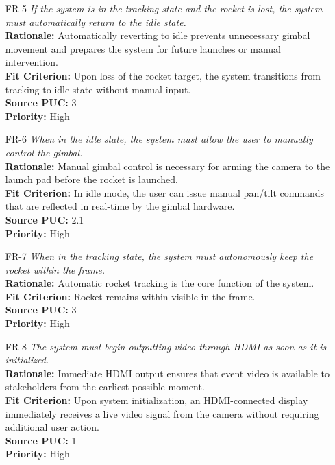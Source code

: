 \documentclass[12pt]{article}
\begin{document}
\begin{itemize}[leftmargin=*]
  \item[FR-5] \emph{If the system is in the tracking state and the rocket is lost, the
          system must automatically return to the idle state.}\\[2mm]
        \textbf{Rationale:} Automatically reverting to idle prevents unnecessary gimbal movement and prepares the system for future launches or manual intervention.\\
        \textbf{Fit Criterion:} Upon loss of the rocket target, the system transitions from tracking to idle state without manual input.\\
        \textbf{Source PUC:} 3 \\
        \textbf{Priority:} High

  \item[FR-6] \emph{When in the idle state, the system must allow the user to manually
          control the gimbal.}\\[2mm]
        \textbf{Rationale:} Manual gimbal control is necessary for arming the camera to the launch pad before the rocket is launched.\\
        \textbf{Fit Criterion:} In idle mode, the user can issue manual pan/tilt commands that are reflected in real-time by the gimbal hardware.\\
        \textbf{Source PUC:} 2.1 \\
        \textbf{Priority:} High

  \item[FR-7] \emph{When in the tracking state, the system must autonomously keep the
          rocket within the frame.}\\[2mm]
        \textbf{Rationale:} Automatic rocket tracking is the core function of the system.\\
        \textbf{Fit Criterion:} Rocket remains within visible in the frame.\\
        \textbf{Source PUC:} 3 \\
        \textbf{Priority:} High

  \item[FR-8] \emph{The system must begin outputting video through HDMI as soon as it
          is initialized.}\\[2mm]
        \textbf{Rationale:} Immediate HDMI output ensures that event video is available to stakeholders from the earliest possible moment.\\
        \textbf{Fit Criterion:} Upon system initialization, an HDMI-connected display immediately receives a live video signal from the camera without requiring additional user action.\\
        \textbf{Source PUC:} 1 \\
        \textbf{Priority:} High


\end{itemize}
\end{document}
